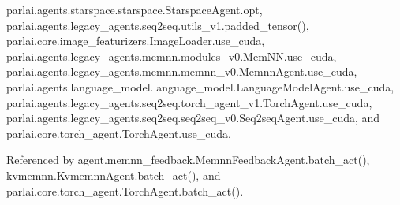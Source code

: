 parlai.\+agents.\+starspace.\+starspace.\+Starspace\+Agent.\+opt, parlai.\+agents.\+legacy\+\_\+agents.\+seq2seq.\+utils\+\_\+v1.\+padded\+\_\+tensor(), parlai.\+core.\+image\+\_\+featurizers.\+Image\+Loader.\+use\+\_\+cuda, parlai.\+agents.\+legacy\+\_\+agents.\+memnn.\+modules\+\_\+v0.\+Mem\+N\+N.\+use\+\_\+cuda, parlai.\+agents.\+legacy\+\_\+agents.\+memnn.\+memnn\+\_\+v0.\+Memnn\+Agent.\+use\+\_\+cuda, parlai.\+agents.\+language\+\_\+model.\+language\+\_\+model.\+Language\+Model\+Agent.\+use\+\_\+cuda, parlai.\+agents.\+legacy\+\_\+agents.\+seq2seq.\+torch\+\_\+agent\+\_\+v1.\+Torch\+Agent.\+use\+\_\+cuda, parlai.\+agents.\+legacy\+\_\+agents.\+seq2seq.\+seq2seq\+\_\+v0.\+Seq2seq\+Agent.\+use\+\_\+cuda, and parlai.\+core.\+torch\+\_\+agent.\+Torch\+Agent.\+use\+\_\+cuda.



Referenced by agent.\+memnn\+\_\+feedback.\+Memnn\+Feedback\+Agent.\+batch\+\_\+act(), kvmemnn.\+Kvmemnn\+Agent.\+batch\+\_\+act(), and parlai.\+core.\+torch\+\_\+agent.\+Torch\+Agent.\+batch\+\_\+act().

